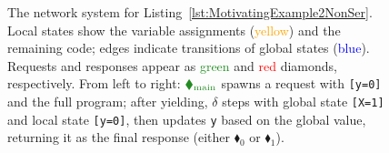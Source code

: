 \begin{figure}[!htbp]
\begin{tikzpicture}[
		node distance=1.5cm and 2.5cm,
		>=stealth,
		thick,
		every node/.style={font=\small}
	]
	\end{tikzpicture}
	\caption{The network system for Listing~\ref{lst:MotivatingExample2NonSer}. 
		Local states show the variable assignments (\textcolor{orange}{yellow}) and the remaining code; edges indicate transitions of global states  (\textcolor{blue}{blue}). 
		Requests and responses appear as \textcolor{ForestGreen}{green} and \textcolor{red}{red} diamonds, respectively. 
		From left to right:  ${\color{ForestGreen}\blacklozenge_{\text{main}}}$ spawns a request with \texttt{[y=0]} and the full program; after yielding, $\delta$ steps with global state \texttt{[X=1]} and local state \texttt{[y=0]}, then updates \texttt{y} based on the global value, returning it as the final response (either {\color{red}$\blacklozenge_0$} or {\color{red}$\blacklozenge_1$}).}

\label{fig:code2ExampleNS}
\end{figure}


